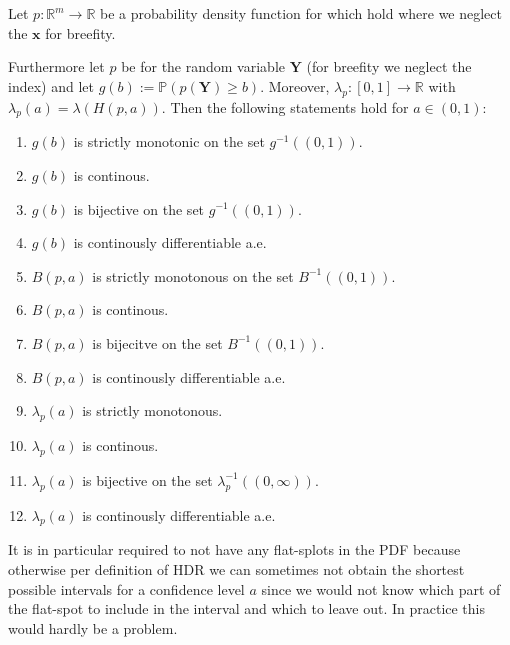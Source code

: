 \begin{lemma}\label{lem:continuity}
    Let \(p: \mathbb{R}^m \to \mathbb{R}\) be a probability density function for which  hold where we neglect the $\mathbf{x}$ for breefity.

    Furthermore let $p$ be for the random variable $\mathbf{Y}$ (for breefity we neglect the index) and let $g(b) := \mathbb{P}(p(\mathbf{Y}) \geq b)$. Moreover, $\lambda_p:[0, 1] \to \mathbb{R}$ with $\lambda_p(a) = \lambda(H(p, a))$. Then the following statements hold for $a \in (0,1)$:

    \begin{enumerate}
        \item $g(b)$ is strictly monotonic on the set $g^{-1}((0,1))$.
        \item $g(b)$ is continous.
        \item $g(b)$ is bijective on the set $g^{-1}((0,1))$.
        \item $g(b)$ is continously differentiable a.e. %
        \item $B(p, a)$ is strictly monotonous on the set $B^{-1}((0,1))$.
        \item $B(p, a)$ is continous.
        \item $B(p, a)$ is bijecitve on the set $B^{-1}((0,1))$.
        \item $B(p, a)$ is continously differentiable a.e. %
        \item $\lambda_p(a)$ is strictly monotonous.
        \item $\lambda_p(a)$ is continous.
        \item $\lambda_p(a)$ is bijective on the set $\lambda_p^{-1}((0,\infty))$.
        \item $\lambda_p(a)$ is continously differentiable a.e. %
    \end{enumerate}
\end{lemma}

It is in particular required to not have any flat-splots in the PDF because otherwise per definition of HDR we can sometimes not obtain the shortest possible intervals for a confidence level $a$ since we would not know which part of the flat-spot to include in the interval and which to leave out. In practice this would hardly be a problem.

